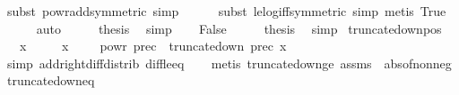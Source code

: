 \begin{isabellebody}
\ {\isacharparenleft}{\kern0pt}subst\ powr{\isacharunderscore}{\kern0pt}add{\isacharbrackleft}{\kern0pt}symmetric{\isacharbrackright}{\kern0pt}{\isacharcomma}{\kern0pt}\ simp{\isacharparenright}{\kern0pt}\isanewline
\ \ \ \ \isamarkupfalse%
\ {\isacharparenleft}{\kern0pt}subst\ le{\isacharunderscore}{\kern0pt}log{\isacharunderscore}{\kern0pt}iff{\isacharbrackleft}{\kern0pt}symmetric{\isacharbrackright}{\kern0pt}{\isacharcomma}{\kern0pt}\ simp{\isacharcomma}{\kern0pt}\ metis\ True{\isacharparenright}{\kern0pt}\isanewline
\ \ \ \ \isamarkupfalse%
\ auto\isanewline
\ \ \isamarkupfalse%
\ \isamarkupfalse%
\ {\isacharquery}{\kern0pt}thesis\ \isamarkupfalse%
\ simp\isanewline
{}\isamarkupfalse%
\isanewline
\ \ \isamarkupfalse%
\ False\isanewline
\ \ \isamarkupfalse%
\ \isamarkupfalse%
\ {\isacharquery}{\kern0pt}thesis\ \isamarkupfalse%
\ simp\isanewline
{}\isamarkupfalse%
%
\endisatagproof
{\isafoldproof}%
%
\isadelimproof
\isanewline
%
\endisadelimproof
\isanewline
{}\isamarkupfalse%
\ truncate{\isacharunderscore}{\kern0pt}down{\isacharunderscore}{\kern0pt}pos{\isacharcolon}{\kern0pt}\isanewline
\ \ \ {\isachardoublequoteopen}x\ {\isasymge}\ {}{\isachardoublequoteclose}\isanewline
\ \ \ {\isachardoublequoteopen}x\ {\isacharasterisk}{\kern0pt}\ {\isacharparenleft}{\kern0pt}{}\ {\isacharminus}{\kern0pt}\ {}\ powr\ {\isacharparenleft}{\kern0pt}{\isacharminus}{\kern0pt}prec{\isacharparenright}{\kern0pt}{\isacharparenright}{\kern0pt}\ {\isasymle}\ truncate{\isacharunderscore}{\kern0pt}down\ prec\ x{\isachardoublequoteclose}\isanewline
%
\isadelimproof
\ \ %
\endisadelimproof
%
\isatagproof
{}\isamarkupfalse%
\ {\isacharparenleft}{\kern0pt}simp\ add{\isacharcolon}{\kern0pt}right{\isacharunderscore}{\kern0pt}diff{\isacharunderscore}{\kern0pt}distrib\ diff{\isacharunderscore}{\kern0pt}le{\isacharunderscore}{\kern0pt}eq{\isacharparenright}{\kern0pt}\isanewline
\ \ \isamarkupfalse%
\ {\isacharparenleft}{\kern0pt}metis\ truncate{\isacharunderscore}{\kern0pt}down{\isacharunderscore}{\kern0pt}ge\ assms\ \ abs{\isacharunderscore}{\kern0pt}of{\isacharunderscore}{\kern0pt}nonneg{\isacharparenright}{\kern0pt}%
\endisatagproof
{\isafoldproof}%
%
\isadelimproof
\isanewline
%
\endisadelimproof
\isanewline
{}\isamarkupfalse%
\ truncate{\isacharunderscore}{\kern0pt}down{\isacharunderscore}{\kern0pt}eq{\isacharcolon}{\kern0pt}\isanewline

\end{isabellebody}
